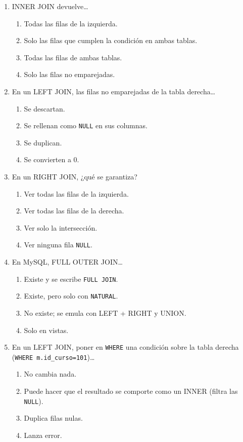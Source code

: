 \documentclass[11pt,a4paper]{article}
\begin{document}
\begin{enumerate}[label=\textbf{\arabic*.}]
\item INNER JOIN devuelve…
  \begin{enumerate}[label=\Alph*.]
    \item Todas las filas de la izquierda.
    \item Solo las filas que cumplen la condición en ambas tablas.
    \item Todas las filas de ambas tablas.
    \item Solo las filas no emparejadas.
  \end{enumerate}

\item En un LEFT JOIN, las filas no emparejadas de la tabla derecha…
  \begin{enumerate}[label=\Alph*.]
    \item Se descartan.
    \item Se rellenan como \texttt{NULL} en sus columnas.
    \item Se duplican.
    \item Se convierten a 0.
  \end{enumerate}

\item En un RIGHT JOIN, ¿qué se garantiza?
  \begin{enumerate}[label=\Alph*.]
    \item Ver todas las filas de la izquierda.
    \item Ver todas las filas de la derecha.
    \item Ver solo la intersección.
    \item Ver ninguna fila \texttt{NULL}.
  \end{enumerate}

\item En MySQL, FULL OUTER JOIN…
  \begin{enumerate}[label=\Alph*.]
    \item Existe y se escribe \texttt{FULL JOIN}.
    \item Existe, pero solo con \texttt{NATURAL}.
    \item No existe; se emula con LEFT + RIGHT y UNION.
    \item Solo en vistas.
  \end{enumerate}

\item En un LEFT JOIN, poner en \texttt{WHERE} una condición sobre la tabla derecha (\texttt{WHERE m.id\_curso=101})…
  \begin{enumerate}[label=\Alph*.]
    \item No cambia nada.
    \item Puede hacer que el resultado se comporte como un INNER (filtra las \texttt{NULL}).
    \item Duplica filas nulas.
    \item Lanza error.
  \end{enumerate}


\end{enumerate}
\end{document}
